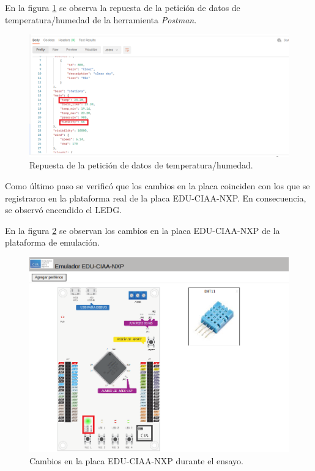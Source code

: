 En la figura \ref{fig:RespuestaPostMan2} se observa la repuesta de la petición de datos de temperatura/humedad de la herramienta \textit{Postman}.
\begin{figure}[ht]
	\centering
	\includegraphics[scale=.36]{./Figures/RespuestaPostMan2.png}
	\caption{Repuesta de la petición de datos de temperatura/humedad.}
	\label{fig:RespuestaPostMan2}
\end{figure}


Como último paso se verificó que los cambios en la placa coinciden con los que se registraron en la plataforma real de la placa EDU-CIAA-NXP. En consecuencia, se observó encendido el LEDG.

\hfill \break
\hfill \break
\hfill \break
\hfill \break
\hfill \break
\hfill \break
\hfill \break
\hfill \break


En la figura \ref{fig:RespuestaLed} se observan los cambios en la placa EDU-CIAA-NXP de la plataforma de emulación.

\begin{figure}[ht]
	\centering
	\includegraphics[scale=.43]{./Figures/RespuestaLed.png}
	\caption{Cambios en la placa EDU-CIAA-NXP durante el ensayo.}
	\label{fig:RespuestaLed}
\end{figure}
